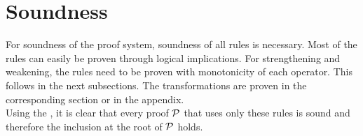 \documentclass[a4paper,twoside,12pt, english]{article}
\begin{document}
\vfill
\section{Soundness}\label{sec:soundness}
For soundness of the proof system, soundness of all rules is necessary. Most of the rules can easily be proven through logical implications. For strengthening and weakening, the rules need to be proven with monotonicity of each operator. This follows in the next subsections.
The transformations are proven in the corresponding section or in the appendix. \\
Using the , it is clear that every proof $\mathcal{P}$ that uses only these rules is sound and therefore the inclusion at the root of $\mathcal{P}$ holds.
\pagebreak
\end{document}
